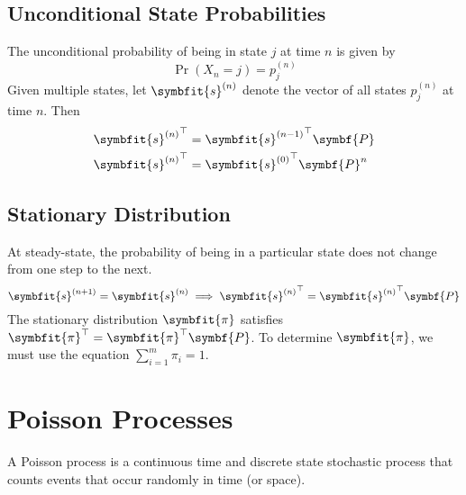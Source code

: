 \documentclass{article}
\begin{document}
\begin{multicols}{3}
    \subsection{Unconditional State Probabilities}
    The unconditional probability of being in state \(j\) at time \(n\) is given by
    \begin{equation*}
        \Pr{\left( X_n = j \right)} = p_j^{(n)}
    \end{equation*}
    Given multiple states, let \(\symbfit{s}^{(n)}\) denote the vector of all states \(p_j^{(n)}\) at
    time \(n\). Then
    \begin{align*}
        {\symbfit{s}^{(n)}}^\top & = {\symbfit{s}^{(n-1)}}^\top \symbf{P} \\
        {\symbfit{s}^{(n)}}^\top & = {\symbfit{s}^{(0)}}^\top \symbf{P}^n
    \end{align*}
    \subsection{Stationary Distribution}
    At steady-state, the probability of being in a particular state does not change from one step to the next.
    \begin{equation*}
        \symbfit{s}^{(n+1)} = \symbfit{s}^{(n)} \implies {\symbfit{s}^{(n)}}^\top = {\symbfit{s}^{(n)}}^\top \symbf{P}
    \end{equation*}
    The stationary distribution \(\symbfit{\pi}\) satisfies \(\symbfit{\pi}^\top = \symbfit{\pi}^\top \symbf{P}\).
    To determine \(\symbfit{\pi}\), we must use the equation \(\sum_{i = 1}^m \pi_i = 1\).


    \section{Poisson Processes}
    A Poisson process is a continuous time and discrete state stochastic process that counts events
    that occur randomly in time (or space).


\end{multicols}
\end{document}
